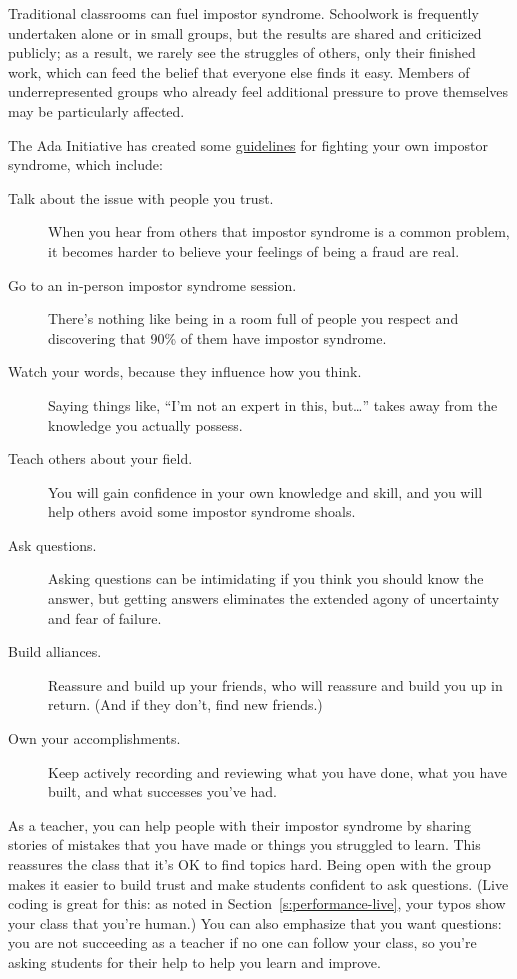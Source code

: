 Traditional classrooms can fuel impostor syndrome. Schoolwork is
frequently undertaken alone or in small groups, but the results are
shared and criticized publicly; as a result, we rarely see the struggles
of others, only their finished work, which can feed the belief that
everyone else finds it easy. Members of underrepresented groups who
already feel additional pressure to prove themselves may be particularly
affected.

The Ada Initiative has created some \href{https://www.usenix.org/blog/impostor-syndrome-proof-yourself-and-your-community}{guidelines} for
fighting your own impostor syndrome, which include:

\begin{description}
\item[Talk about the issue with people you trust.]
When you hear from others that impostor syndrome is a common
problem, it becomes harder to believe your feelings of being a fraud
are real.
\item[Go to an in-person impostor syndrome session.]
There's nothing like being in a room full of people you respect and
discovering that 90\% of them have impostor syndrome.
\item[Watch your words, because they influence how you think.]
Saying things like, ``I'm not an expert in this, but\ldots{}''
takes away from the knowledge you actually possess.
\item[Teach others about your field.]
You will gain confidence in your own knowledge and skill, and you
will help others avoid some impostor syndrome shoals.
\item[Ask questions.]
Asking questions can be intimidating if you think you should know
the answer, but getting answers eliminates the extended agony of
uncertainty and fear of failure.
\item[Build alliances.]
Reassure and build up your friends, who will reassure and build you
up in return. (And if they don't, find new friends.)
\item[Own your accomplishments.]
Keep actively recording and reviewing what you have done, what you
have built, and what successes you've had.
\end{description}

As a teacher, you can help people with their impostor syndrome by
sharing stories of mistakes that you have made or things you struggled
to learn. This reassures the class that it's OK to find topics hard.
Being open with the group makes it easier to build trust and make
students confident to ask questions. (Live coding is great for this: as
noted in Section~\ref{s:performance-live}, your typos show your class
that you're human.) You can also emphasize that you want questions: you
are not succeeding as a teacher if no one can follow your class, so
you're asking students for their help to help you learn and improve.

